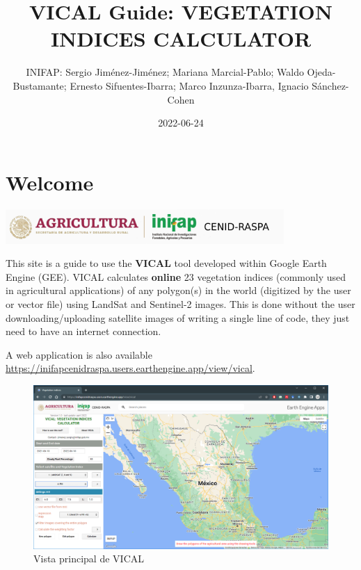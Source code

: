 \documentclass[
]{book}
\title{VICAL Guide: VEGETATION INDICES CALCULATOR}
\author{INIFAP: Sergio Jiménez-Jiménez; Mariana Marcial-Pablo; Waldo Ojeda-Bustamante; Ernesto Sifuentes-Ibarra; Marco Inzunza-Ibarra, Ignacio Sánchez-Cohen}
\date{2022-06-24}
\begin{document}
\maketitle

{
\setcounter{tocdepth}{1}
\tableofcontents
}
\hypertarget{welcome}{%
\chapter*{Welcome}\label{welcome}}

\begin{center}\includegraphics{./images/LogoVICAL} \end{center}

This site is a guide to use the \textbf{VICAL} tool developed within Google Earth Engine (GEE). VICAL calculates \textbf{online} 23 vegetation indices (commonly used in agricultural applications) of any polygon(s) in the world (digitized by the user or vector file) using LandSat and Sentinel-2 images. This is done without the user downloading/uploading satellite images of writing a single line of code, they just need to have an internet connection.

A web application is also available \url{https://inifapcenidraspa.users.earthengine.app/view/vical}.

\begin{figure}

{\centering \includegraphics[width=0.9\linewidth]{./images/Captura2} 

}

\caption{Vista principal de VICAL}\label{fig:fig2}
\end{figure}
\end{document}
